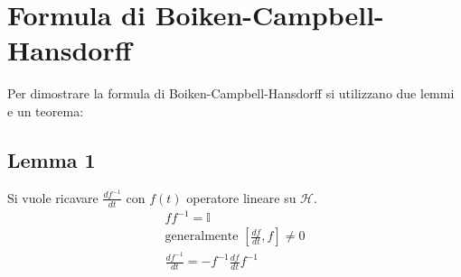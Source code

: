 \section{Formula di Boiken-Campbell-Hansdorff} %
Per dimostrare la formula di Boiken-Campbell-Hansdorff si utilizzano due lemmi e un teorema:
\subsection{Lemma 1} %
Si vuole ricavare $\frac{df^{-1}}{dt}$ con $f\left(t\right)$ operatore lineare su $\mathcal{H}$.
\begin{equation}\begin{split}
ff^{-1}=\mathbb{I} \\
\textrm{generalmente } \left[\frac{df}{dt},f\right]\neq 0 \\
\frac{df^{-1}}{dt}=-f^{-1}\frac{df}{dt}f^{-1}
\end{split}\end{equation}

